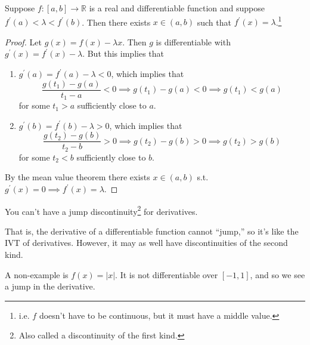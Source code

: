   \begin{theorem}
    Suppose $f: [a, b] \to \mathbb{R}$ is a real and differentiable function and suppose $f^\prime (a) < \lambda < f^\prime (b)$. Then there exists $x \in (a, b)$ such that $f^\prime (x) = \lambda$.\footnote{i.e. $f$ doesn't have to be continuous, but it must have a middle value.}
  \end{theorem}
  \begin{proof}
    Let $g(x) = f(x) - \lambda x$. Then $g$ is differentiable with $g^\prime (x) = f^\prime (x) - \lambda$. But this implies that
    \begin{enumerate}
      \item $g^\prime (a) = f^\prime (a) - \lambda < 0$, which implies that 
      \begin{equation}
        \frac{g(t_1) - g(a)}{t_1 - a} < 0 \implies g(t_1) - g(a) < 0 \implies g(t_1) < g(a)
      \end{equation}
      for some $t_1 > a$ sufficiently close to $a$. 

      \item $g^\prime (b) = f^\prime (b) - \lambda > 0$, which implies that 
      \begin{equation}
        \frac{g(t_2) - g(b)}{t_2 - b} > 0 \implies g(t_2) - g(b) > 0 \implies g(t_2) > g(b)
      \end{equation}
      for some $t_2 < b$ sufficiently close to $b$. 
    \end{enumerate}
    By the mean value theorem there exists $x \in (a, b)$ s.t. $g^\prime (x) = 0 \implies f^\prime (x) = \lambda$. 
  \end{proof}

  \begin{corollary}
    You can't have a jump discontinuity\footnote{Also called a discontinuity of the first kind.} for derivatives. 
  \end{corollary}

  That is, the derivative of a differentiable function cannot ``jump,'' so it's like the IVT of derivatives. However, it may as well have discontinuities of the second kind. 

  \begin{example}
    A non-example is $f(x) = |x|$. It is not differentiable over $[-1, 1]$, and so we see a jump in the derivative. 
  \end{example}

